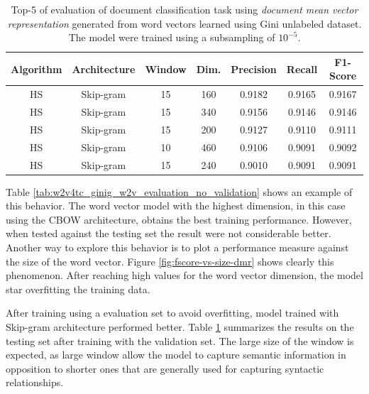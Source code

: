 \begin{table}[!htpb]

  \centering
  \caption{Top-5 of evaluation of document classification task using
    \textit{document mean vector representation} generated from word vectors learned
  using Gini unlabeled dataset. The model were trained using a subsampling of
  $10^{-5}$.}
  \label{tab:w2v4tc_gini_w2v_evaluation}

\small
\begin{tabular}{|c|c|c|c|c|c|c|}
\hline
 Algorithm  &  Architecture  &  Window  &  Dim.  &  Precision  &    Recall  &  F1-Score  \\
\hline
\ac{HS}    &  Skip-gram     &      15  &   160  &   0.9182 &  0.9165  &  0.9167  \\
\ac{HS}    &  Skip-gram     &      15  &   340  &   0.9156  &  0.9146  &  0.9146  \\
\ac{HS}    &  Skip-gram     &      15  &   200  &   0.9127  &  0.9110  &  0.9111  \\
\ac{HS}    &  Skip-gram     &      10  &   460  &   0.9106  &  0.9091  &  0.9092  \\
\ac{HS}    &  Skip-gram     &      15  &   240  &   0.9010  &  0.9091  & 0.9091  \\
\hline
\end{tabular}
\end{table}



Table \ref{tab:w2v4tc_ginig_w2v_evaluation_no_validation} shows an example
of this behavior. The word vector model with the highest dimension, in this
case using the CBOW architecture, obtains the best training performance.
However, when tested against the testing set the result were not considerable
better. Another way to explore this behavior is to plot a performance
measure against the size of the word vector. Figure
\ref{fig:fscore-vs-size-dmr} shows clearly this phenomenon. After reaching high values
for the word vector dimension, the model star overfitting  the training data. 

After training using a evaluation set to avoid overfitting,  model trained
with Skip-gram architecture performed better. Table
\ref{tab:w2v4tc_gini_w2v_evaluation} summarizes the results on the testing
set after training with the validation set. The large size of the window is
expected, as large window allow the model to capture semantic information in
opposition to shorter ones that are generally used for capturing syntactic relationships.

